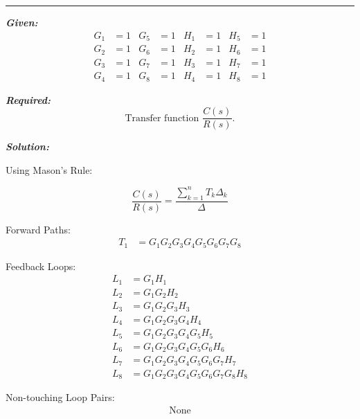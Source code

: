 ﻿\documentclass[11pt]{article}
\begin{document}
\noindent\rule{\textwidth}{1pt}

\vspace{12pt}

\noindent\textbf{\textit{Given:}}
\[
\begin{aligned}
G_1 &= 1 & G_5 &= 1 & H_1 &= 1 & H_5 &= 1 \\
G_2 &= 1 & G_6 &= 1 & H_2 &= 1 & H_6 &= 1 \\
G_3 &= 1 & G_7 &= 1 & H_3 &= 1 & H_7 &= 1 \\
G_4 &= 1 & G_8 &= 1 & H_4 &= 1 & H_8 &= 1
\end{aligned}
\]

\vspace{12pt}

\noindent\textbf{\textit{Required:}}
\[
\text{Transfer function } \frac{C(s)}{R(s)}.
\]

\vspace{12pt}

\noindent \textbf{\textit{Solution:}}

\vspace{2pt}
{Using Mason's Rule:}

\[
\frac{C(s)}{R(s)} = \frac{\sum_{k=1}^{n} T_k \Delta_k}{\Delta}
\]

Forward Paths:
\begin{align*}
T_1 &= G_1 G_2 G_3 G_4 G_5 G_6 G_7 G_8
\end{align*}

\vspace{0.5em}

Feedback Loops:
\begin{align*}
L_1 &= G_1 H_1 \\
L_2 &= G_1 G_2 H_2 \\
L_3 &= G_1 G_2 G_3 H_3 \\
L_4 &= G_1 G_2 G_3 G_4 H_4 \\
L_5 &= G_1 G_2 G_3 G_4 G_5 H_5 \\
L_6 &= G_1 G_2 G_3 G_4 G_5 G_6 H_6 \\
L_7 &= G_1 G_2 G_3 G_4 G_5 G_6 G_7 H_7 \\
L_8 &= G_1 G_2 G_3 G_4 G_5 G_6 G_7 G_8 H_8
\end{align*}

\vspace{0.5em}

Non-touching Loop Pairs:
\begin{align*}
\text{None}
\end{align*}

\vspace{0.5em}
\end{document}
